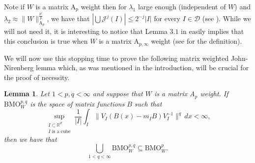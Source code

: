 \documentclass[12pt,reqno ]{amsart}
\numberwithin{equation}{section}
\newtheorem{lemma}[theorem]{Lemma}
\theoremstyle{definition}
\newcommand{\R}{\ensuremath{\mathbb{R}}}
\newcommand{\D}{\ensuremath{\mathscr{D}}}
\newcommand{\J}{\ensuremath{\mathscr{J}}}
\newcommand{\BMOW}{\ensuremath{{\text{BMO}}_W ^p}}
\newcommand{\BMOWpq}{\ensuremath{{\text{BMO}}_W ^{p, q}}}
\begin{document}
Note if $W$ is a matrix A${}_p$ weight then for $\lambda_1 $ large enough (independent of $W$) and $\lambda_2  \approx \|W\|_{\text{A}_p} ^{\frac{p'}{p}}$, we have that $|\bigcup \J ^j (I)| \leq 2^{-j} |I|$ for every $I \in \D$ (see \cite{I, IKP}). While we will not need it, it is interesting to notice that Lemma $3.1$ in \cite{V} easily implies that this conclusion is true when $W$ is a matrix A${}_{p, \infty}$ weight (see \cite{V} for the definition).



We will now use this stopping time to prove the following matrix weighted John-Nirenberg lemma which, as was mentioned in the introduction,  will be crucial for the proof of necessity.     \begin{lemma} \label{JNlemma} Let $1 < p , q < \infty$ and suppose that $W$ is a matrix A${}_p$ weight. If  $\BMOWpq$ is the space of matrix functions $B$ such that  \begin{equation*}  \sup_{\substack{I \subset \R^d \\  I \text{ is a cube}}} \frac{1}{|I|} \int_I \|V_I (B(x) - m_I B) V_I ^{-1} \|^q \, dx < \infty,   \end{equation*} then we have that \begin{equation*} \bigcup_{1 < q < \infty} \BMOWpq \subseteq \BMOW. \end{equation*}  \end{lemma}
\end{document}
